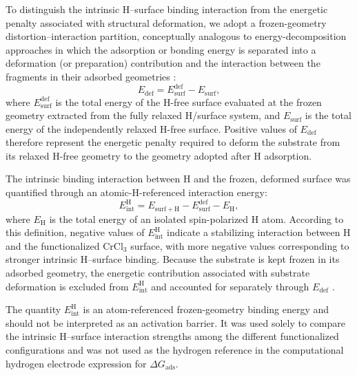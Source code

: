 \documentclass[journal=jacsat,manuscript=article]{achemso}
\begin{document}
To distinguish the intrinsic H--surface binding interaction from the
energetic penalty associated with structural deformation, we adopt a
frozen-geometry distortion--interaction partition, conceptually
analogous to energy-decomposition approaches in which the adsorption
or bonding energy is separated into a deformation (or preparation)
contribution and the interaction between the fragments in their
adsorbed geometries \cite{Raupach2015,Staub2019,Clabaut2020}:
\begin{equation}
    E_{\mathrm{def}}=E_{\mathrm{surf}}^{\mathrm{def}}-E_{\mathrm{surf}},
    \label{eq:Edef}
\end{equation}
where $E_{\mathrm{surf}}^{\mathrm{def}}$ is the total energy of the H-free surface evaluated at the frozen geometry extracted from the fully relaxed H/surface system, and $E_{\mathrm{surf}}$ is the total energy of the independently relaxed H-free surface. Positive values of $E_{\mathrm{def}}$ therefore represent the energetic penalty required to deform the substrate from its relaxed H-free geometry to the geometry adopted after H adsorption.

The intrinsic binding interaction between H and the frozen, deformed surface was quantified through an atomic-H-referenced interaction energy:
\begin{equation}
    E_{\mathrm{int}}^{\mathrm{H}}
    =
    E_{\mathrm{surf+H}}
    -
    E_{\mathrm{surf}}^{\mathrm{def}}
    -
    E_{\mathrm{H}},
    \label{eq:Eint}
\end{equation}
where $E_{\mathrm{H}}$ is the total energy of an isolated spin-polarized H atom. According to this definition, negative values of $E_{\mathrm{int}}^{\mathrm{H}}$ indicate a stabilizing interaction between H and the functionalized CrCl$_3$ surface, with more negative values corresponding to stronger intrinsic H--surface binding. Because the substrate is kept frozen in its adsorbed geometry, the energetic contribution associated with substrate deformation is excluded from $E_{\mathrm{int}}^{\mathrm{H}}$ and accounted for separately through $E_{\mathrm{def}}$ \cite{Staub2019,Clabaut2020}.

The quantity $E_{\mathrm{int}}^{\mathrm{H}}$ is an atom-referenced frozen-geometry binding energy and should not be interpreted as an activation barrier. It was used solely to compare the intrinsic H--surface interaction strengths among the different functionalized configurations and was not used as the hydrogen reference in the computational hydrogen electrode expression for $\Delta G_{\mathrm{ads}}$.
\end{document}
